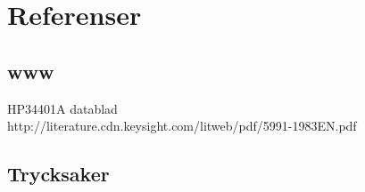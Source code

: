 \documentclass[11pt,a4paper]{article}
\begin{document}
\newpage

\section{Referenser}\label{refs}

\subsection{www}\label{interwebs}
HP34401A datablad\\
http://literature.cdn.keysight.com/litweb/pdf/5991-1983EN.pdf

\subsection{Trycksaker}\label{literature} %


\end{document}
